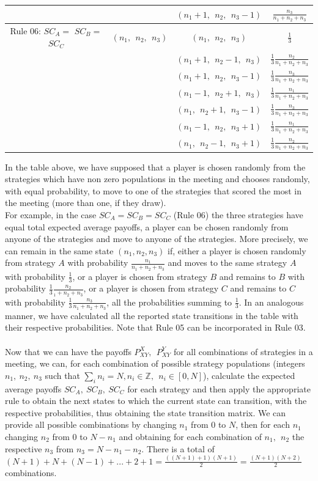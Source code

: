 \documentclass[12pt]{report}
\begin{document}
\begin{center}
\begin{tabular}{|c|c|c|c|}
&  & $(n_1+1,\ \ n_2,\ \ n_3-1)$ & $\frac{n_3}{n_1+n_2+n_3}$ \\
\hline
Rule 06: $SC_A=$ $SC_B=$ $SC_C$ & $(n_1,\ \ n_2,\ \ n_3)$ & $(n_1,\ \ n_2,\ \ n_3)$ & $\frac{1}{3}$ \\
&  & $(n_1+1,\ \ n_2-1,\ \ n_3)$ & $\frac{1}{3}\frac{n_2}{n_1+n_2+n_3}$ \\
&  & $(n_1+1,\ \ n_2,\ \ n_3-1)$ & $\frac{1}{3}\frac{n_3}{n_1+n_2+n_3}$ \\
&  & $(n_1-1,\ \ n_2+1,\ \ n_3)$ & $\frac{1}{3}\frac{n_1}{n_1+n_2+n_3}$ \\
&  & $(n_1,\ \ n_2+1,\ \ n_3-1)$ & $\frac{1}{3}\frac{n_3}{n_1+n_2+n_3}$ \\
&  & $(n_1-1,\ \ n_2,\ \ n_3+1)$ & $\frac{1}{3}\frac{n_1}{n_1+n_2+n_3}$ \\
&  & $(n_1,\ \ n_2-1,\ \ n_3+1)$ & $\frac{1}{3}\frac{n_2}{n_1+n_2+n_3}$ \\
\hline
\end{tabular}
\end{center}
In the table above, we have supposed that a player is chosen randomly from the strategies which have non zero populations in the meeting and chooses randomly, with equal probability, to move to one of the strategies that scored the most in the meeting (more than one, if they draw).
\\
For example, in the case $SC_A=SC_B=SC_C$ (Rule 06) the three strategies have equal total expected average payoffs, a player can be chosen randomly from anyone of the strategies and move to anyone of the strategies. More precisely, we can remain in the same state $(n_1,n_2,n_3)$ if, either a player is chosen randomly from strategy $A$ with probability $\frac{n_1}{n_1+n_2+n_3}$ and moves to the same strategy $A$ with probability $\frac{1}{3}$, or a player is chosen from strategy $B$ and remains to $B$ with probability $\frac{1}{3}\frac{n_2}{_1+n_2+n_3}$, or a player is chosen from strategy $C$ and remains to $C$ with probability $\frac{1}{3}\frac{n_3}{n_1+n_2+n_3}$, all the probabilities summing to $\frac{1}{3}$. In an analogous manner, we have calculated all the reported state transitions in the table with their respective probabilities. Note that Rule 05 can be incorporated in Rule 03.
\\\\
Now that we can have the payoffs $P_{XY}^X,\ \ P_{XY}^Y$ for all combinations of strategies in a meeting, we can, for each combination of possible strategy populations (integers $n_1,\ n_2,\ n_3$ such that $\sum_{i}n_i=N, n_i\in \mathbb{Z},\ \ n_i\in [0,N]$), calculate the expected average payoffs $SC_A,\ SC_B,\ SC_C$ for each strategy and then apply the appropriate rule to obtain the next states to which the current state can transition, with the respective probabilities, thus obtaining the state transition matrix. We can provide all possible combinations by changing $n_1$ from $0$ to $N$, then for each $n_1$ changing $n_2$ from $0$ to $N-n_1$ and obtaining for each combination of $n_1, \ \ n_2$ the respective $n_3$ from $n_3=N-n_1-n_2$. There is a total of $(N+1)+N+(N-1)+...+2+1=\frac{((N+1)+1)(N+1)}{2}=\frac{(N+1)(N+2)}{2}$ combinations.
\end{document}
